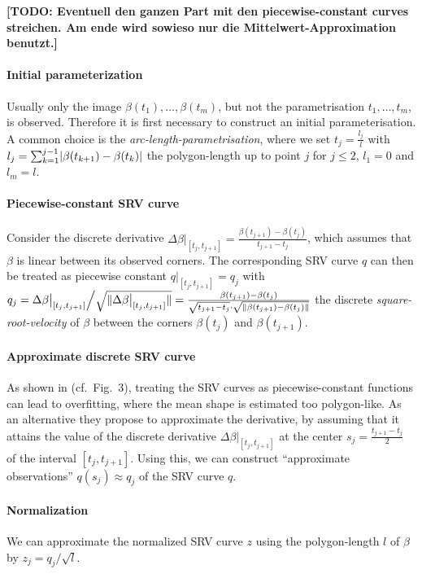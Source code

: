\textbf{[TODO: Eventuell den ganzen Part mit den piecewise-constant curves streichen. Am ende wird sowieso nur die Mittelwert-Approximation benutzt.]}

\paragraph{Initial parameterization}
Usually only the image $\beta(t_1),\dots,\beta(t_m)$, but not the parametrisation $t_1,\dots,t_m$, is observed.
Therefore it is first necessary to construct an initial parameterisation.
A common choice is the \emph{arc-length-parametrisation}, where we set $t_j = \frac{l_j}{l}$ with $l_j = \sum_{k=1}^{j-1} \lvert\beta(t_{k+1}) - \beta(t_k)\rvert$ the polygon-length up to point $j$ for $j \leq 2$, $l_1 = 0$ and $l_m = l$.

\paragraph{Piecewise-constant SRV curve} 
Consider the discrete derivative $\Delta \beta \big\rvert_{[t_j, t_{j+1}]} = \frac{\beta(t_{j+1}) - \beta(t_{j})}{t_{j+1} - t_j}$, which assumes that $\beta$ is linear between its observed corners. 
The corresponding SRV curve $q$ can then be treated as piecewise constant $q\big\rvert_{[t_{j},t_{j+1}]} = q_j$ with $q_j = \Delta \beta \big\rvert_{[t_j, t_{j+1}]} \Big/ \sqrt{\lVert\Delta \beta \big\rvert_{[t_j, t_{j+1}]}\rVert} = \frac{\beta(t_{j+1}) - \beta(t_j)}{\sqrt{t_{j+1} - t_j} \cdot \sqrt{\lVert\beta(t_{j+1}) - \beta(t_j)\rVert}}$ the discrete \emph{square-root-velocity} of $\beta$ between the corners $\beta(t_j)$ and $\beta(t_{j+1})$.

\paragraph{Approximate discrete SRV curve} As shown in \cite{Steyer2021} (cf.\ Fig.\ 3), treating the SRV curves as piecewise-constant functions can lead to overfitting, where the mean shape is estimated too polygon-like.
As an alternative they propose to approximate the derivative, by assuming that it attains the value of the discrete derivative $\Delta \beta \big\rvert_{[t_j,t_{j+1}]}$ at the center $s_j = \frac{t_{j+1} - t_j}{2}$ of the interval $[t_j, t_{j+1}]$.
Using this, we can construct \enquote{approximate observations} $q(s_j) \approx q_j$ of the SRV curve $q$.

\paragraph{Normalization}
We can approximate the normalized SRV curve $z$ using the polygon-length $l$ of $\beta$ by $z_j = q_j \big/ \sqrt{l}$.

